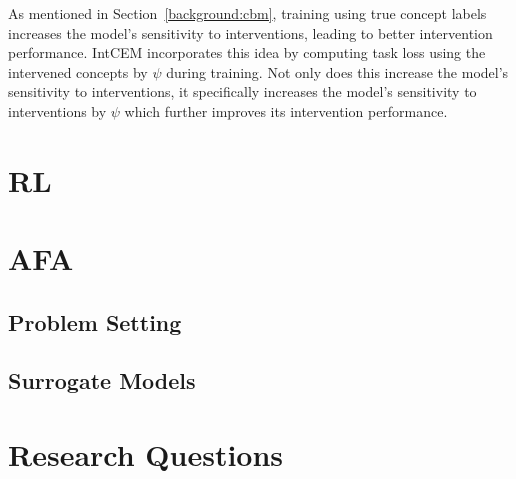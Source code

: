 \documentclass[../main.tex]{subfiles}
\begin{document}
As mentioned in Section~\ref{background:cbm}, training using
true concept labels increases the model's sensitivity
to interventions, leading to better intervention performance.
IntCEM incorporates this idea by computing task loss
using the intervened concepts by $\psi$ during training.
Not only does this increase the model's sensitivity to interventions,
it specifically increases the model's sensitivity to interventions
by $\psi$ which further improves its intervention performance.



\section{RL} %

\section{AFA}

\subsection{Problem Setting} %

\subsection{Surrogate Models} %

\section{Research Questions} %
\end{document}
